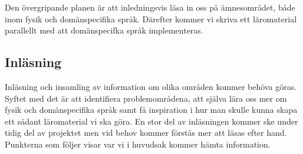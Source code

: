 \documentclass[12pt,a4paper]{scrartcl}
\begin{document}
Den övergripande planen är att inledningsvis läsa in oss på ämnesområdet, både inom fysik och domänspecifika språk. Därefter kommer vi skriva ett läromaterial parallellt med att domänspecifka språk implementeras.

\subsection{Inläsning}

Inläsning och insamling av information om olika områden kommer behöva göras. Syftet med det är att identifiera problemområdena, att själva lära oss mer om fysik och domänspecifika språk samt få inspiration i hur man skulle kunna skapa ett sådant läromaterial vi ska göra. En stor del av inläsningen kommer ske under tidig del av projektet men vid behov kommer förstås mer att läsas efter hand. Punkterna som följer visar var vi i huvudsak kommer hämta information.
\end{document}
